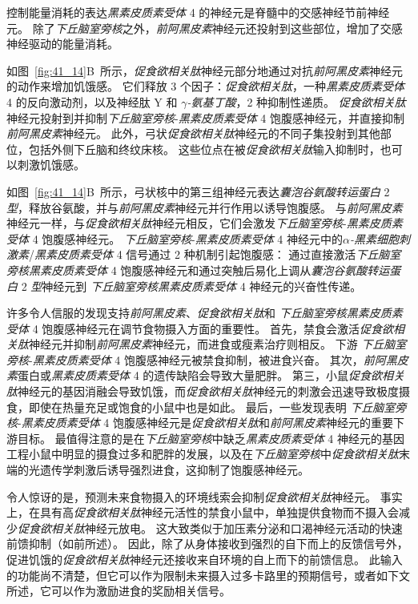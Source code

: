 控制能量消耗的表达\textit{黑素皮质素受体} 4 的神经元是脊髓中的交感神经节前神经元。
除了\textit{下丘脑室旁核}之外，\textit{前阿黑皮素}神经元还投射到这些部位，增加了交感神经驱动的能量消耗。


如图~\ref{fig:41_14}B~所示，\textit{促食欲相关肽}神经元部分地通过对抗\textit{前阿黑皮素}神经元的动作来增加饥饿感。
它们释放 3 个因子：\textit{促食欲相关肽}，一种\textit{黑素皮质素受体} 4 的反向激动剂，以及神经肽 Y 和 \textit{$ \gamma $-氨基丁酸}，2 种抑制性递质。
\textit{促食欲相关肽}神经元投射到并抑制\textit{下丘脑室旁核}-\textit{黑素皮质素受体} 4 饱腹感神经元，并直接抑制\textit{前阿黑皮素}神经元。
此外，弓状\textit{促食欲相关肽}神经元的不同子集投射到其他部位，包括外侧下丘脑和终纹床核。
这些位点在被\textit{促食欲相关肽}输入抑制时，也可以刺激饥饿感。


如图~\ref{fig:41_14}B~所示，弓状核中的第三组神经元表达\textit{囊泡谷氨酸转运蛋白} 2 \textit{型}，释放谷氨酸，并与\textit{前阿黑皮素}神经元并行作用以诱导饱腹感。
与\textit{前阿黑皮素}神经元一样，与\textit{促食欲相关肽}神经元相反，它们会激发\textit{下丘脑室旁核}-\textit{黑素皮质素受体} 4 饱腹感神经元。
\textit{下丘脑室旁核}-\textit{黑素皮质素受体} 4 神经元中的\textit{$\alpha$-黑素细胞刺激素}/\textit{黑素皮质素受体} 4 信号通过 2 种机制引起饱腹感：
通过直接激活\textit{下丘脑室旁核}\textit{黑素皮质素受体} 4 饱腹感神经元和通过突触后易化上调从\textit{囊泡谷氨酸转运蛋白} 2 \textit{型}神经元到 \textit{下丘脑室旁核}\textit{黑素皮质素受体} 4 神经元的兴奋性传递。


许多令人信服的发现支持\textit{前阿黑皮素}、\textit{促食欲相关肽}和 \textit{下丘脑室旁核}\textit{黑素皮质素受体} 4 饱腹感神经元在调节食物摄入方面的重要性。
首先，禁食会激活\textit{促食欲相关肽}神经元并抑制\textit{前阿黑皮素}神经元，而进食或瘦素治疗则相反。
下游 \textit{下丘脑室旁核}-\textit{黑素皮质素受体} 4 饱腹感神经元被禁食抑制，被进食兴奋。
其次，\textit{前阿黑皮素}蛋白或\textit{黑素皮质素受体} 4 的遗传缺陷会导致大量肥胖。
第三，小鼠\textit{促食欲相关肽}神经元的基因消融会导致饥饿，而\textit{促食欲相关肽}神经元的刺激会迅速导致极度摄食，即使在热量充足或饱食的小鼠中也是如此。
最后，一些发现表明 \textit{下丘脑室旁核}-\textit{黑素皮质素受体} 4 饱腹感神经元是\textit{促食欲相关肽}和\textit{前阿黑皮素}神经元的重要下游目标。
最值得注意的是在\textit{下丘脑室旁核}中缺乏\textit{黑素皮质素受体} 4 神经元的基因工程小鼠中明显的摄食过多和肥胖的发展，以及在\textit{下丘脑室旁核}中\textit{促食欲相关肽}末端的光遗传学刺激后诱导强烈进食，这抑制了饱腹感神经元。


令人惊讶的是，预测未来食物摄入的环境线索会抑制\textit{促食欲相关肽}神经元。
事实上，在具有高\textit{促食欲相关肽}神经元活性的禁食小鼠中，单独提供食物而不摄入会减少\textit{促食欲相关肽}神经元放电。
这大致类似于加压素分泌和口渴神经元活动的快速前馈抑制（如前所述）。
因此，除了从身体接收到强烈的自下而上的反馈信号外，促进饥饿的\textit{促食欲相关肽}神经元还接收来自环境的自上而下的前馈信息。
此输入的功能尚不清楚，但它可以作为限制未来摄入过多卡路里的预期信号，或者如下文所述，它可以作为激励进食的奖励相关信号。


